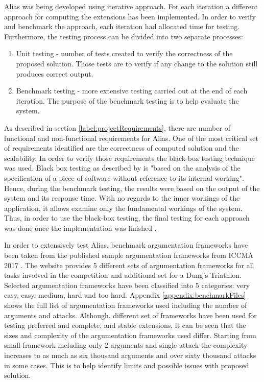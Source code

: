 Alias was being developed using iterative approach. For each iteration a different approach for computing the extensions has been implemented. In order to verify and benchmark the approach, each iteration had allocated time for testing. Furthermore, the testing process can be divided into two separate processes: 
\begin{enumerate}
	\item Unit testing - number of tests created to verify the correctness of the proposed solution. Those tests are to verify if any change to the solution still produces correct output. 
	\item Benchmark testing - more extensive testing carried out at the end of each iteration. The purpose of the benchmark testing is to help evaluate the system. 
\end{enumerate}


As described in section \ref{label:projectRequirements}, there are number of functional and non-functional requirements for Alias. One of the most critical set of requirements identified are the correctness of computed solution and the scalability. In order to verify those requirements the black-box testing technique was used. Black box testing as described by \citet{testing2} is "based on the analysis of the specification of a piece of software without reference to its internal working". Hence, during the benchmark testing, the results were based on the output of the system and its response time. With no regards to the inner workings of the application, it allows examine only the fundamental workings of the system. Thus, in order to use the black-box testing, the final testing for each approach was done once the implementation was finished \citep{blackbox}.

In order to extensively test Alias, benchmark argumentation frameworks have been taken from the published sample argumentation frameworks from ICCMA 2017 \citep{iccmaResults}. The website provides 5 different sets of argumentation frameworks for all tasks involved in the competition and additional set for a Dung's Triathlon. Selected argumentation frameworks have been classified into 5 categories: very easy, easy, medium, hard and too hard. Appendix \ref{appendix:benchmarkFiles} shows the full list of argumentation frameworks used including the number of arguments and attacks. Although, different set of frameworks have been used for testing preferred and complete, and stable extensions, it can be seen that the sizes and complexity of the argumentation frameworks used differ. Starting from small framework including only 2 arguments and single attack the complexity increases to as much as six thousand arguments and over sixty thousand attacks in some cases. This is to help identify limits and possible issues with proposed solution. 

